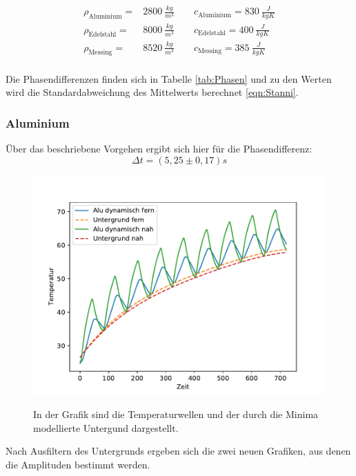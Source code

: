 \documentclass[titlepage = firstcover]{scrartcl}
\begin{document}
  \begin{align*}
    \rho_{\text{Aluminium}} =& 2800 \: \frac{kg}{m^3} \qquad    c_{\text{Aluminium}}=830 \: \frac{J}{kgK}\\
    \rho_{\text{Edelstahl}} =& 8000 \: \frac{kg}{m^3} \qquad    c_{\text{Edelstahl}}=400 \: \frac{J}{kgK}\\
    \rho_{\text{Messing}} =& 8520 \: \frac{kg}{m^3} \qquad c_{\text{Messing}}=385  \: \frac{J}{kgK}  \\
  \end{align*}



  Die Phasendifferenzen finden sich in Tabelle \ref{tab:Phasen} und zu den Werten wird die Standardabweichung des Mittelwerts berechnet \eqref{eqn:Stanni}.

    \subsubsection{Aluminium}
    Über das beschriebene Vorgehen ergibt sich hier für die Phasendifferenz:
    \begin{equation*}
      \Delta t = (5,25 \pm 0,17) s
    \end{equation*}
      \begin{figure}[h]
        \centering
        \caption{In der Grafik sind die Temperaturwellen und der durch die Minima modellierte Untergund dargestellt.}
        \includegraphics{dynamischalu1.pdf}
        \label{fig:dynamischalu}
      \end{figure}

    Nach Ausfiltern des Untergrunds ergeben sich die zwei neuen Grafiken, aus denen die Amplituden bestimmt werden. 
\end{document}
